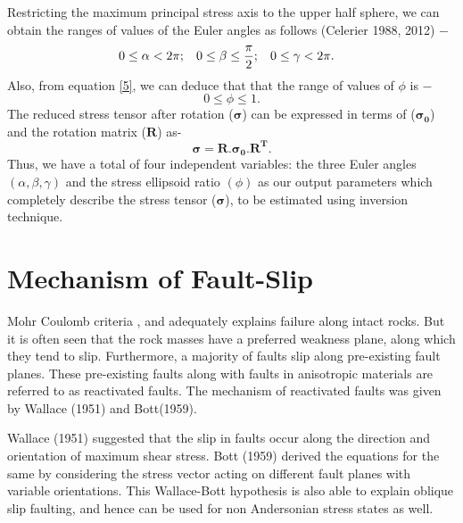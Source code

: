 \normalsize
Restricting the maximum principal stress axis to the upper half sphere, we can obtain the ranges of values of the Euler angles as follows (Celerier 1988, 2012) $-$
\begin{equation}
\label{7}
0 \le \alpha < 2\pi; \hspace{3mm} 0 \le \beta \le \frac{\pi}{2}; \hspace{3mm} 0 \le \gamma < 2\pi. \hspace{3mm}
\end{equation} 
Also, from equation \ref{5}, we can deduce that that the range of values of $\phi$ is $-$
\begin{equation}
\label{8}
0 \le \phi \le 1.
\end{equation}
The reduced stress tensor after rotation ($\bm{\sigma}$) can be expressed in terms of ($\bm{\sigma_{0}}$) and the rotation matrix ($\bm{R}$) as-
\begin{equation} \label{9}
\bm{\sigma} = \bm{R}.\bm{\sigma_{0}}.\bm{R^T}.
\end{equation}
Thus, we have a total of four independent variables: the three Euler angles $(\alpha, \beta, \gamma)$ and the stress ellipsoid ratio $(\phi)$ as our output parameters which completely describe the stress tensor  ($\bm{\sigma}$), to be estimated using inversion technique. 

\section{Mechanism of Fault-Slip}
Mohr Coulomb criteria , and adequately explains failure along intact rocks. But it is often seen that the rock masses have a preferred weakness plane, along which they tend to slip. Furthermore, a majority of faults slip along pre-existing fault planes. These pre-existing faults along with faults in anisotropic materials are referred to as reactivated faults. The mechanism of reactivated faults was given by Wallace (1951) and Bott(1959).

Wallace (1951) suggested that the slip in faults occur along the direction and orientation of maximum shear stress. Bott (1959) derived the equations for the same by considering the stress vector acting on different fault planes with variable orientations. This Wallace-Bott hypothesis is also able to explain oblique slip faulting, and hence can be used for non Andersonian stress states as well.

